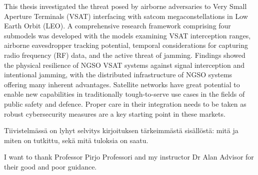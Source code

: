 \documentclass[english, 12pt, a4paper, elec, utf8, a-1b, online]{aaltothesis}
\begin{document}
\begin{abstractpage}[english]
  This thesis investigated the threat posed by airborne adversaries to Very Small Aperture Terminals (VSAT) interfacing with satcom megaconstellations in Low Earth Orbit (LEO). A comprehensive research framework comprising four submodels was developed with the models examining VSAT interception ranges, airborne eavesdropper tracking potential, temporal considerations for capturing radio frequency (RF) data, and the active threat of jamming. Findings showed the physical resilience of NGSO VSAT systems against signal interception and intentional jamming, with the distributed infrastructure of NGSO systems offering many inherent advantages. Satellite networks have great potential to enable new capabilities in traditionally tough-to-serve use cases in the fields of public safety and defence. Proper care in their integration needs to be taken as robust cybersecurity measures are a key starting point in these markets.
\end{abstractpage}


\newpage

\begin{abstractpage}[finnish]
  Tiivistelmässä on lyhyt selvitys
  kirjoituksen tärkeimmästä sisällöstä: mitä ja miten on tutkittu,
  sekä mitä tuloksia on saatu. 
\end{abstractpage}


I want to thank Professor Pirjo Professori and my instructor Dr Alan Advisor for their good and poor guidance.\\
\end{document}
